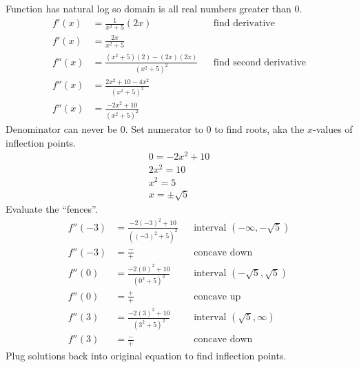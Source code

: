 \documentclass{article}
\begin{document}
\begin{description}
\begin{description}
                Function has natural log so domain is all real numbers greater than 0.
                \begin{align*}
                  f'(x)  & =  \frac{1}{x^2+5}(2x)                     &  & \text{find derivative}        \\
                  f'(x)  & =  \frac{2x}{x^2+5}                        &  &                               \\[2em]
                  f''(x) & =  \frac{(x^2+5)(2) - (2x)(2x)}{(x^2+5)^2} &  & \text{find second derivative} \\
                  f''(x) & =  \frac{2x^2+10 - 4x^2}{(x^2+5)^2}                                           \\
                  f''(x) & =  \frac{-2x^2 + 10}{(x^2+5)^2}
                \end{align*}
                Denominator can never be 0. Set numerator to 0 to find roots, aka the $x$-values of inflection points.
                \begin{align*}
                  0 = -2x^2 + 10 \\
                  2x^2 = 10      \\
                  x^2 = 5        \\
                  x = \pm \sqrt{5}
                \end{align*}
                Evaluate  the ``fences''.
                \begin{align*}
                  f''(-3) & =  \frac{-2(-3)^2 + 10}{((-3)^2+5)^2} &  & \text{interval $(-\infty, -\sqrt{5})$}  \\
                  f''(-3) & = \frac{-}{+}                         &  & \text{concave down}                     \\[2em]
                  f''(0)  & =  \frac{-2(0)^2 + 10}{(0^2+5)^2}     &  & \text{interval $(-\sqrt{5}, \sqrt{5})$} \\
                  f''(0)  & = \frac{+}{+}                         &  & \text{concave up}                       \\[2em]
                  f''(3)  & =  \frac{-2(3)^2 + 10}{(3^2+5)^2}     &  & \text{interval $(\sqrt{5}, \infty)$}    \\
                  f''(3)  & = \frac{-}{+}                         &  & \text{concave down}
                \end{align*}
                Plug solutions back into original equation to find inflection points.
                \begin{align*}

\end{align*}
\end{description}
\end{description}
\end{document}
